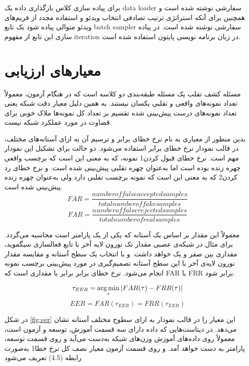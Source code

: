 برای پیاده سازی کلاس بارگذاری داده یک data loader سفارشی نوشته شده است و همچنین برای آنکه استراتژی ترتیب تصادفی انتخاب ویدئو و استفاده مجدد از فریم‌های ویدئو متوالی پیاده شود یک تابع batch sampler سفارشی نوشته شده است. در پیاده سازی این تابع از مفهوم iteration در زبان برنامه نویسی پایتون استفاده شده است.
\section{معیارهای ارزیابی}
مسئله کشف تقلب یک مسئله طبقه‌بندی دو کلاسه است که در هنگام آزمون، معمولاً تعداد نمونه‌های واقعی و تقلبی یکسان نیستند. به همین دلیل معیار دقت شبکه یعنی تعداد نمونه‌های درست پیش‌بینی شده تقسیم بر تعداد کل نمونه‌ها ملاک خوبی برای قضاوت در مورد عملکرد شبکه نیست. 

بدین منظور از معیاری به نام نرخ خطای برابر و ترسیم آن به ازای آستانه‌های مختلف، در قالب نمودار نرخ خطای برابر استفاده می‌شود. 
دو حالت برای تشکیل این نمودار مهم است. نرخ خطای قبول کردن1 نمونه، که به معنی این است که برچسب واقعی چهره زنده بوده است اما به‌عنوان چهره تقلبی پیش‌بینی شده است. و نرخ خطای رد کردن2 که به معنی این است که نمونه برچسب تقلبی دارد ولی به‌عنوان چهره زنده پیش‌بینی شده است.
\begin{equation} \label{eq:far}
	FAR = \frac{number of false accepted samples}{total number of fake samples}
\end{equation}
\begin{equation} \label{eq:frr}
	FAR = \frac{number of false rejected samples}{total number of real samples}
\end{equation}

معمولاً این مقدار بر اساس یک آستانه که یکی از یک پارامتر است محاسبه می‌گردد. برای مثال در شبکه‌ی عصبی مقدار تک نورون لایه آخر با تابع فعالسازی سیگموید، مقداری بین صفر و یک خواهد داشت. و با انتخاب یک سطح آستانه و مقایسه مقدار نورون لایه‌ی آخر با این سطح آستانه تصمیم‌گیری در مورد پیش‌بینی برچسب نمونه انجام می‌شود. نرخ خطای برابر برابر با مقداری است که FAR با FRR برابر شود.

\begin{equation}\label{eq:taueer}
	\tau_{EER} = \operatorname*{arg\,min}_{\tau}|FAR(\tau)-FRR(\tau)|
\end{equation}
\begin{equation}\label{eq:eer}
	EER=FAR(\tau_{EER})=FRR(\tau_{EER})
\end{equation}

در شکل
\ref{fig:eer}
این معیار را در قالب نمودار به ازای سطوح مختلف آستانه نشان می‌دهد. در دیتاست‌هایی که داده دارای سه قسمت آموزش، توسعه و آزمون است، معمولاً روی داده‌های آموزش وزن‌های شبکه به‌دست می‌آید و روی قسمت توسعه، پارامتر   به دست خواهد آمد. و روی قسمت آزمون معیار نصف کل نرخ خطا1 به‌صورت رابطه (4.5) تعریف می‌شود

